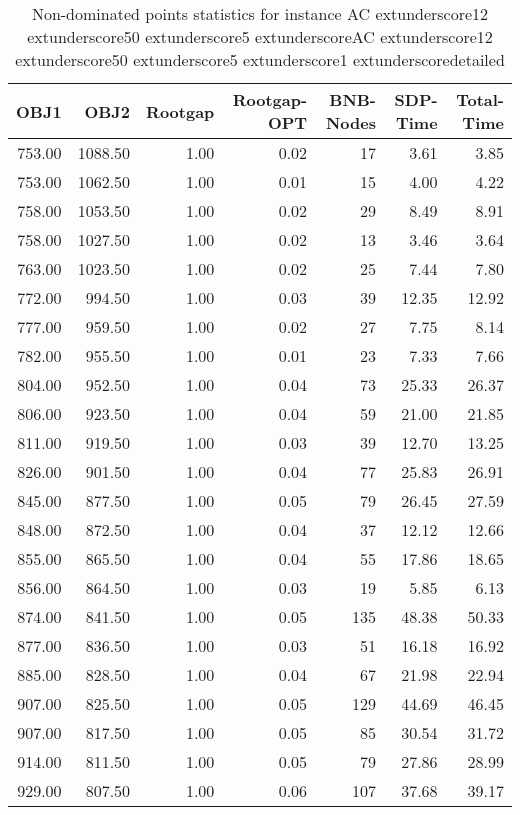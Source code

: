 \begin{table}
\caption{Non-dominated points statistics for instance AC	extunderscore12	extunderscore50	extunderscore5	extunderscoreAC	extunderscore12	extunderscore50	extunderscore5	extunderscore1	extunderscoredetailed}
\label{tab:stats/AC_12_50_5_AC_12_50_5_1_detailed}
\begin{tabular}{rrrrrrr}
\toprule
OBJ1 & OBJ2 & Rootgap & Rootgap-OPT & BNB-Nodes & SDP-Time & Total-Time \\
\midrule
753.00 & 1088.50 & 1.00 & 0.02 & 17 & 3.61 & 3.85 \\
753.00 & 1062.50 & 1.00 & 0.01 & 15 & 4.00 & 4.22 \\
758.00 & 1053.50 & 1.00 & 0.02 & 29 & 8.49 & 8.91 \\
758.00 & 1027.50 & 1.00 & 0.02 & 13 & 3.46 & 3.64 \\
763.00 & 1023.50 & 1.00 & 0.02 & 25 & 7.44 & 7.80 \\
772.00 & 994.50 & 1.00 & 0.03 & 39 & 12.35 & 12.92 \\
777.00 & 959.50 & 1.00 & 0.02 & 27 & 7.75 & 8.14 \\
782.00 & 955.50 & 1.00 & 0.01 & 23 & 7.33 & 7.66 \\
804.00 & 952.50 & 1.00 & 0.04 & 73 & 25.33 & 26.37 \\
806.00 & 923.50 & 1.00 & 0.04 & 59 & 21.00 & 21.85 \\
811.00 & 919.50 & 1.00 & 0.03 & 39 & 12.70 & 13.25 \\
826.00 & 901.50 & 1.00 & 0.04 & 77 & 25.83 & 26.91 \\
845.00 & 877.50 & 1.00 & 0.05 & 79 & 26.45 & 27.59 \\
848.00 & 872.50 & 1.00 & 0.04 & 37 & 12.12 & 12.66 \\
855.00 & 865.50 & 1.00 & 0.04 & 55 & 17.86 & 18.65 \\
856.00 & 864.50 & 1.00 & 0.03 & 19 & 5.85 & 6.13 \\
874.00 & 841.50 & 1.00 & 0.05 & 135 & 48.38 & 50.33 \\
877.00 & 836.50 & 1.00 & 0.03 & 51 & 16.18 & 16.92 \\
885.00 & 828.50 & 1.00 & 0.04 & 67 & 21.98 & 22.94 \\
907.00 & 825.50 & 1.00 & 0.05 & 129 & 44.69 & 46.45 \\
907.00 & 817.50 & 1.00 & 0.05 & 85 & 30.54 & 31.72 \\
914.00 & 811.50 & 1.00 & 0.05 & 79 & 27.86 & 28.99 \\
929.00 & 807.50 & 1.00 & 0.06 & 107 & 37.68 & 39.17 \\

\end{tabular}
\end{table}
